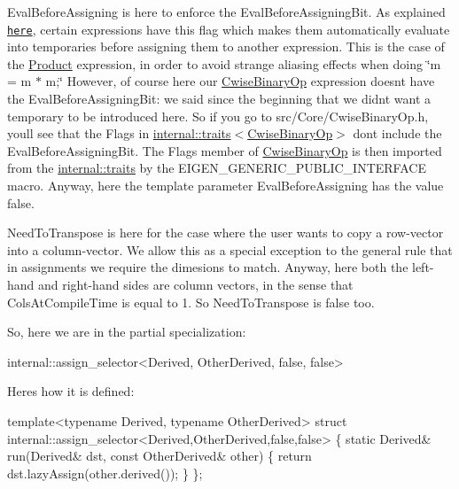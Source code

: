 Eval\+Before\+Assigning is here to enforce the Eval\+Before\+Assigning\+Bit. As explained \href{TopicLazyEvaluation.html}{\tt here}, certain expressions have this flag which makes them automatically evaluate into temporaries before assigning them to another expression. This is the case of the \hyperlink{group___core___module_class_eigen_1_1_product}{Product} expression, in order to avoid strange aliasing effects when doing \char`\"{}m = m $\ast$ m;\char`\"{} However, of course here our \hyperlink{group___core___module_class_eigen_1_1_cwise_binary_op}{Cwise\+Binary\+Op} expression doesn\textquotesingle{}t have the Eval\+Before\+Assigning\+Bit\+: we said since the beginning that we didn\textquotesingle{}t want a temporary to be introduced here. So if you go to src/\+Core/\+Cwise\+Binary\+Op.\+h, you\textquotesingle{}ll see that the Flags in \hyperlink{struct_eigen_1_1internal_1_1traits}{internal\+::traits}$<$\hyperlink{group___core___module_class_eigen_1_1_cwise_binary_op}{Cwise\+Binary\+Op}$>$ don\textquotesingle{}t include the Eval\+Before\+Assigning\+Bit. The Flags member of \hyperlink{group___core___module_class_eigen_1_1_cwise_binary_op}{Cwise\+Binary\+Op} is then imported from the \hyperlink{struct_eigen_1_1internal_1_1traits}{internal\+::traits} by the E\+I\+G\+E\+N\+\_\+\+G\+E\+N\+E\+R\+I\+C\+\_\+\+P\+U\+B\+L\+I\+C\+\_\+\+I\+N\+T\+E\+R\+F\+A\+CE macro. Anyway, here the template parameter Eval\+Before\+Assigning has the value {\ttfamily false}.

Need\+To\+Transpose is here for the case where the user wants to copy a row-\/vector into a column-\/vector. We allow this as a special exception to the general rule that in assignments we require the dimesions to match. Anyway, here both the left-\/hand and right-\/hand sides are column vectors, in the sense that Cols\+At\+Compile\+Time is equal to 1. So Need\+To\+Transpose is {\ttfamily false} too.

So, here we are in the partial specialization\+: 
\begin{DoxyCode}
internal::assign\_selector<Derived, OtherDerived, false, false>
\end{DoxyCode}


Here\textquotesingle{}s how it is defined\+: 
\begin{DoxyCode}
\textcolor{keyword}{template}<\textcolor{keyword}{typename} Derived, \textcolor{keyword}{typename} OtherDerived>
\textcolor{keyword}{struct }internal::assign\_selector<Derived,OtherDerived,false,false> \{
  \textcolor{keyword}{static} Derived& run(Derived& dst, \textcolor{keyword}{const} OtherDerived& other) \{ \textcolor{keywordflow}{return} dst.lazyAssign(other.derived()); \}
\};
\end{DoxyCode}


